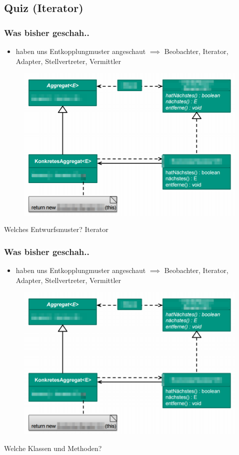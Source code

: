\documentclass[18pt]{beamer}
\begin{document}
	\subsection{Quiz (Iterator)}
	\begin{frame}
		\frametitle{Was bisher geschah..}
		\begin{itemize}
			\item haben uns Entkopplungmuster angeschaut
			\linebreak $\implies$ Beobachter, Iterator, Adapter, Stellvertreter, Vermittler
		\end{itemize}
		\begin{figure}
			\includegraphics[scale=0.25]{./pics/tut4/iter-mod.png}
		\end{figure}
		Welches Entwurfsmuster? \pause Iterator
	\end{frame}
	
	\begin{frame}
		\frametitle{Was bisher geschah..}
		\begin{itemize}
			\item haben uns Entkopplungmuster angeschaut
			\linebreak $\implies$ Beobachter, Iterator, Adapter, Stellvertreter, Vermittler
		\end{itemize}
		\begin{figure}
			\includegraphics[scale=0.25]{./pics/tut4/iter-mod.png}
		\end{figure}
		Welche Klassen und Methoden?
	\end{frame}
	
\end{document}
